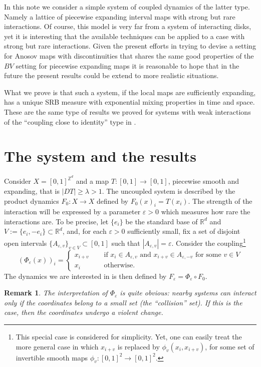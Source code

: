\documentclass{amsart}
\numberwithin{equation}{section}
\newtheorem{rem}[thm]{Remark}
\begin{document}
In this note we consider a simple system of coupled dynamics of the latter
type. Namely a lattice of piecewise expanding interval maps with strong but
rare interactions.  Of course, this model is very far from a system of
interacting disks, yet it is interesting that the available techniques can be
applied to a case with strong but rare interactions. Given the present efforts
in trying to devise a setting for Anosov maps with discontinuities that shares
the same good properties of the $BV$ setting for piecewise expanding maps
\cite{demer-liverani, baladi-gouezel} it is reasonable to hope that in the
future the present results could be extend to more realistic situations.

What we prove is that such a system, if the local maps are sufficiently
expanding, has a unique SRB measure with exponential mixing properties in time
and space. These are the same type of results we proved for systems with weak interactions of the
``coupling close to identity'' type in \cite{kl-cmp}.

\section{The system and the results}

Consider $X=[0,1]^{{{\mathbb Z}}^d}$ and a map $T:[0,1]\to [0,1]$, piecewise smooth and
expanding, that is $|DT|\geq \lambda>1$. The uncoupled system is described by
the product dynamics $F_0:X\to X$ defined by $F_0(x)_i=T(x_i)$. The strength
of the interaction will be expressed by a parameter ${\varepsilon}>0$ which measures how
rare the interactions are. To be precise, let $\{e_i\}$ be the standard base
of ${{\mathbb R}}^d$ and $V:=\{e_i, -e_i\}\subset {{\mathbb R}}^d$, and, for each ${\varepsilon}>0$
sufficiently small, fix a set of disjoint open intervals $\{A_{{\varepsilon},v}\}_{v\in
  V}\subset [0,1]$ such that $|A_{{\varepsilon},v}|={\varepsilon}$. Consider the
coupling\footnote{This special case is considered for simplicity. Yet, one can
  easily treat the more general case in which $x_{i+v}$ is replaced by
  $\phi_v(x_i, x_{i+v})$, for some set of invertible smooth maps
  $\phi_v:[0,1]^2\to[0,1]^2$.}
\[
(\Phi_{\varepsilon}(x))_i=\begin{cases} x_{i+v}\quad &\text{ if } x_i\in A_{{\varepsilon},v} \text{ and } x_{i+v}\in A_{{\varepsilon},-v} \text{ for some }v\in V\\
  x_i &\text { otherwise.}
                                               \end{cases}
\] 
The dynamics we are interested in is then defined by $F_{\varepsilon}=\Phi_{\varepsilon}\circ F_0$.
\begin{rem}
  The interpretation of $\Phi_{\varepsilon}$ is quite obvious: nearby systems can
  interact only if the coordinates belong to a small set (the ``collision''
  set). If this is the case, then the coordinates undergo a violent change.
\end{rem}  
 
\end{document}
